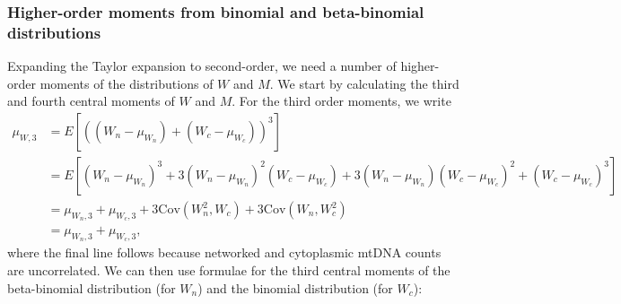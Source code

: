 \documentclass{article}
\begin{document}
\begin{appendices}
\subsubsection{Higher-order moments from binomial and beta-binomial distributions}
Expanding the Taylor expansion to second-order, we need a number of higher-order moments of the distributions of $W$ and $M$. We start by calculating the third and fourth central moments of $W$ and $M$. For the third order moments, we write
\begin{equation}\label{eq:thirdcentralW}
    \begin{split}
        \mu_{W,3}&=E[((W_n-\mu_{W_n})+(W_c-\mu_{W_c}))^3]\\
        &=E[(W_n-\mu_{W_n})^3+3(W_n-\mu_{W_n})^2(W_c-\mu_{W_c})+
          3(W_n-\mu_{W_n})(W_c-\mu_{W_c})^2+(W_c-\mu_{W_c})^3]\\
          &=\mu_{W_n,3}+\mu_{W_c,3}+3\mathrm{Cov}(W_n^2,W_c)+
            3\mathrm{Cov}(W_n,W_c^2)\\
          &=\mu_{W_n,3}+\mu_{W_c,3},
    \end{split}
\end{equation}
where the final line follows because networked and cytoplasmic mtDNA counts are uncorrelated. We can then use formulae for the third central moments of the beta-binomial distribution (for $W_n$) and the binomial distribution (for $W_c$):


\end{appendices}
\end{document}
